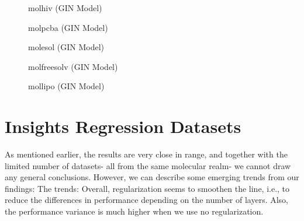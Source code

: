 \begin{figure}
    \centering
    \caption{molhiv (GIN Model)}
    \label{fig:gcn-molfreesolv}
\end{figure}

\begin{figure}
    \centering
    \caption{molpcba (GIN Model)}
    \label{fig:gcn-molfreesolv}
\end{figure}

\begin{figure}
    \centering
    \caption{molesol (GIN Model)}
    \label{fig:gcn-molfreesolv}
\end{figure}

\begin{figure}
    \centering
    \caption{molfreesolv (GIN Model)}
    \label{fig:gcn-molfreesolv}
\end{figure}

\begin{figure}
    \centering
    \caption{mollipo (GIN Model)}
    \label{fig:gcn-molfreesolv}
\end{figure}
\section{Insights Regression Datasets}





As mentioned earlier, the results are very close in range, and together with the limited number of datasets- all from the same molecular realm- we cannot draw any general conclusions. However, we can describe some emerging trends from our findings:
The trends:
Overall, regularization seems to smoothen the line, i.e., to reduce the differences in performance depending on the number of layers. Also, the performance variance is much higher when we use no regularization.


